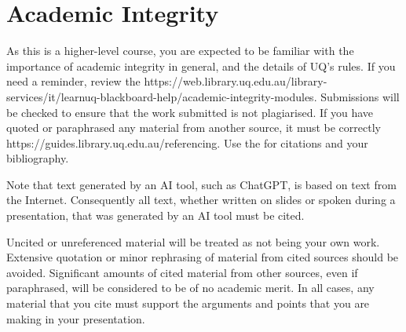 \documentclass{csse4400}
\begin{document}
%
%


\section{Academic Integrity}
As this is a higher-level course, you are expected to be familiar with the importance of academic integrity in general,
and the details of UQ's rules.
If you need a reminder, review the 
{https://web.library.uq.edu.au/library-services/it/learnuq-blackboard-help/academic-integrity-modules}.
Submissions will be checked to ensure that the work submitted is not plagiarised.
If you have quoted or paraphrased any material from another source, it must be correctly 
{https://guides.library.uq.edu.au/referencing}.
Use the  for citations and your bibliography.

Note that text generated by an AI tool, such as ChatGPT, is based on text from the Internet.
Consequently all text, whether written on slides or spoken during a presentation,
that was generated by an AI tool must be cited.

Uncited or unreferenced material will be treated as not being your own work.
Extensive quotation or minor rephrasing of material from cited sources should be avoided.
Significant amounts of cited material from other sources, even if paraphrased, will be considered to be of no academic merit.
In all cases, any material that you cite must support the arguments and points that you are making in your presentation.
\end{document}
